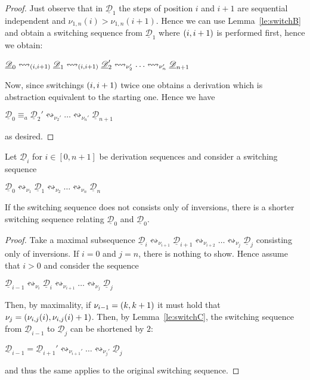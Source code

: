 \documentclass[a4paper,UKenglish,cleveref,pdftex,thm-restate,numberwithinsect,anonymous]{lipics}
\newcommand{\interval}[2][1]{\ensuremath{[{#1},{#2}]}}
\newcommand{\dder}[1]{\mathscr{#1}}
\newcommand{\der}[1]{\underline{\dder{#1}}}
\newcommand{\shift}[1]{\ensuremath{\mathrel{{\leftrightsquigarrow}_{#1}}}}
\begin{document}
\begin{proof}
  Just observe that in $\der{D}_1$ the steps of position $i$ and $i+1$
  are sequential independent and $\nu_{1,n}(i) >
  \nu_{1,n}(i+1)$. Hence we can use Lemma~\ref{le:switchB} and obtain
  a switching sequence from $\der{D}_1$ where $\transp{i}$ is
  performed first, hence we obtain:
  \begin{center}
    $\der{D}_0 \shift{\transp{i}}
    \der{D}_1 \shift{\transp{i}}
    \der{D}_2' \shift{\nu_2'} \ldots
    \shift{\nu_n'} \der{D}_{n+1}$
  \end{center}

  Now, since switchings $\transp{i}$ twice one obtains a derivation
  which is abstraction equivalent to the starting one.  Hence we have
  \begin{center}
    $\der{D}_0 \equiv_a
    \der{D}_2' \shift{\nu_2'} \ldots
    \shift{\nu_n'} \der{D}_{n+1}$
  \end{center}
  as desired.
\end{proof}


\begin{lemma}
  \label{le:switchD}
  Let $\der{D}_i$ for $i \in \interval[0]{n+1}$ be derivation sequences
  and consider a switching sequence
  \begin{center}
    $\der{D}_0 \shift{\nu_1} \der{D}_1 \shift{\nu_2} \ldots
    \shift{\nu_n}\der{D}_n$
  \end{center}
  If the switching sequence does not consists only of inversions,
  there is a shorter switching sequence relating $\der{D}_0$ and
  $\der{D}_0$.
\end{lemma}

\begin{proof}
  Take a maximal subsequence
  $\der{D}_i \shift{\nu_{i+1}} \der{D}_{i+1} \shift{\nu_{i+2}} \ldots
  \shift{\nu_j}\der{D}_j$ consisting only of inversions.
  If $i=0$ and $j=n$, there is nothing to show. Hence assume that
  $i>0$ and consider the sequence
  \begin{center}
    $\der{D}_{i-1} \shift{\nu_{i}} \der{D}_{i} \shift{\nu_{i+1}} \ldots
    \shift{\nu_j}\der{D}_j$
  \end{center}
  Then, by maximality, if $\nu_{i-1}=\transp{k}$ it must hold that
  $\nu_{j}=\transp{\nu_{i,j}(i)}$. Then, by Lemma~\ref{le:switchC},
  the switching sequence from $\der{D}_{i-1}$ to $\der{D}_{j}$ can be
  shortened by $2$:
  \begin{center}
    $\der{D}_{i-1} = \der{D}_{i+1}' \shift{\nu_{i+1}'} \ldots
    \shift{\nu_j'}\der{D}_j$
  \end{center}
  and thus the same applies to the original switching sequence.
\end{proof}
\end{document}
